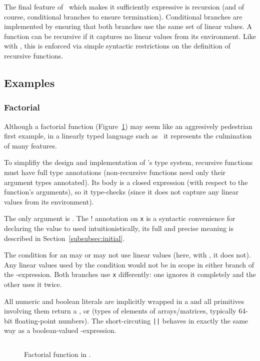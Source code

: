 The final feature of \lang\ which makes it sufficiently expressive is recursion
(and of course, conditional branches to ensure termination). Conditional
branches are implemented by ensuring that both branches use the same set of
linear values. A function can be recursive if it captures no linear values from
its environment. Like with , this is enforced via simple syntactic
restrictions on the definition of recursive functions.

\subsection{Examples}

\subsubsection{Factorial}

Although a factorial function (Figure~\ref{fig:lang_factorial}) may seem like
an aggresively pedestrian first example, in a linearly typed language such as
\lang\ it represents the culmination of many features.

To simplifiy the design and implementation of \lang's type system, recursive
functions must have full type annotations (non-recursive functions need only
their argument types annotated). Its body is a closed expression (with respect
to the function's arguments), so it type-checks (since it does not capture any
linear values from its environment).

The only argument is . The ! annotation on \texttt{x} is a
syntactic convenience for declaring the value to used intuitionistically, its
full and precise meaning is described in Section~\ref{subsubsec:initial}.

The condition for an  may or may not use linear values (here, with
, it does not). Any linear values used by the condition
would not be in scope in either branch of the -expression.  Both
branches use \texttt{x} differently: one ignores it completely and the other
uses it twice.

All numeric and boolean literals are implicitly wrapped in a  and
all primitives involving them return a ,  or
 (types of elements of arrays/matrices, typically 64-bit
floating-point numbers). The short-circuting \texttt{||} behaves in exactly the
same way as a boolean-valued -expression.

\begin{figure}[t]
    \centering
    \inputminted[fontsize=\small, linenos]{ocaml}{../../test/examples/factorial.lt}
    \caption{Factorial function in \lang.}\label{fig:lang_factorial}
\end{figure}

